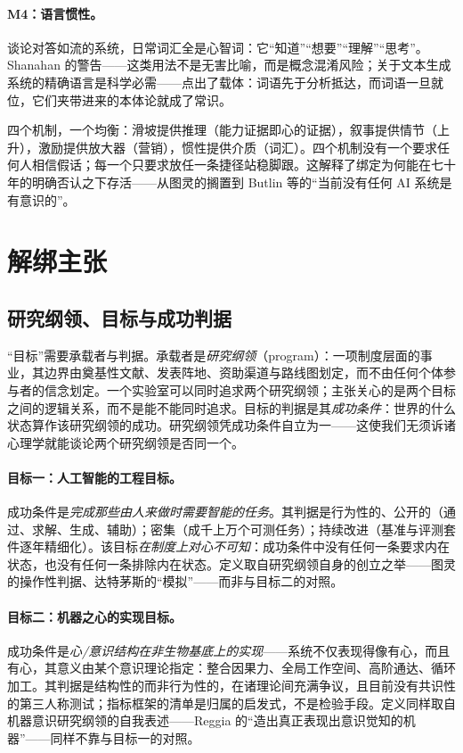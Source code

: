 \documentclass[10pt,fontset=fandol]{ctexart}
\begin{document}
\paragraph{M4：语言惯性。}谈论对答如流的系统，日常词汇全是心智词：它“知道”“想要”“理解”“思考”。Shanahan 的警告——这类用法不是无害比喻，而是概念混淆风险；关于文本生成系统的精确语言是科学必需\cite{shanahan2024talking}——点出了载体：词语先于分析抵达，而词语一旦就位，它们夹带进来的本体论就成了常识。

四个机制，一个均衡：滑坡提供推理（能力证据即心的证据），叙事提供情节（上升），激励提供放大器（营销），惯性提供介质（词汇）。四个机制没有一个要求任何人相信假话；每一个只要求放任一条捷径站稳脚跟。这解释了绑定为何能在七十年的明确否认之下存活——从图灵的搁置到 Butlin 等的“当前没有任何 AI 系统是有意识的”\cite{butlin2023consciousness}。

\section{解绑主张}\label{sec:postulate}

\subsection{研究纲领、目标与成功判据}\label{sec:goals}

“目标”需要承载者与判据。承载者是\emph{研究纲领}（program）：一项制度层面的事业，其边界由奠基性文献、发表阵地、资助渠道与路线图划定，而不由任何个体参与者的信念划定。一个实验室可以同时追求两个研究纲领；主张关心的是两个目标之间的逻辑关系，而不是能不能同时追求。目标的判据是其\emph{成功条件}：世界的什么状态算作该研究纲领的成功。研究纲领凭成功条件自立为一——这使我们无须诉诸心理学就能谈论两个研究纲领是否同一个。

\paragraph{目标一：人工智能的工程目标。}成功条件是\emph{完成那些由人来做时需要智能的任务}。其判据是行为性的、公开的（通过、求解、生成、辅助）；密集（成千上万个可测任务）；持续改进（基准与评测套件逐年精细化）。该目标\emph{在制度上对心不可知}：成功条件中没有任何一条要求内在状态，也没有任何一条排除内在状态。定义取自研究纲领自身的创立之举——图灵的操作性判据\cite{turing1950}、达特茅斯的“模拟”\cite{mccarthy1955proposal}——而非与目标二的对照。

\paragraph{目标二：机器之心的实现目标。}成功条件是\emph{心/意识结构在非生物基底上的实现}——系统不仅表现得像有心，而且有心，其意义由某个意识理论指定：整合因果力\cite{albantakis2023iit}、全局工作空间、高阶通达、循环加工。其判据是结构性的而非行为性的，在诸理论间充满争议，且目前没有共识性的第三人称测试；指标框架的清单\cite{butlin2023consciousness}是归属的启发式，不是检验手段。定义同样取自机器意识研究纲领的自我表述——Reggia 的“造出真正表现出意识觉知的机器”\cite{reggia2013rise}——同样不靠与目标一的对照。
\end{document}
